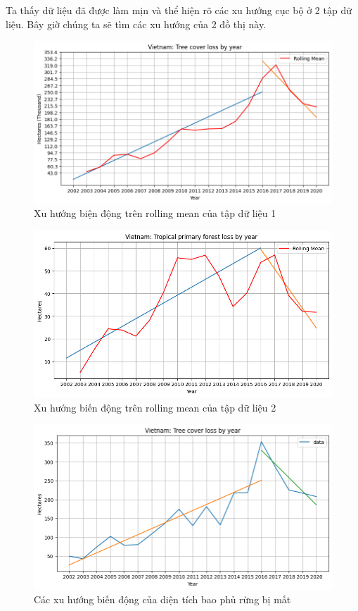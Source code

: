 \documentclass[a4paper,12pt]{report}
\begin{document}
\begin{flushleft}
	Ta thấy dữ liệu đã được làm mịn và thể hiện rõ các xu hướng cục bộ ở 2 tập dữ liệu. Bây giờ chúng ta sẽ tìm các xu hướng của 2 đồ thị này.

	\begin{figure}[H]
			\centering
			\includegraphics[width = \textwidth]{images/tree_cover_loss_by_year_trends_rolling_mean.png}
			\caption{Xu hướng biện động trên rolling mean của tập dữ liệu 1}
	\end{figure}

	\begin{figure}[H]
			\centering
			\includegraphics[width = \textwidth]{images/tropical_primary_forest_loss_by_year_trends_rolling_mean.png}
			\caption{Xu hướng biến động trên rolling mean của tập dữ liệu 2}
	\end{figure}

	\begin{figure}[H]
			\centering
			\includegraphics[width = \textwidth]{images/tree_cover_loss_by_year_trends.png}
			\caption{Các xu hướng biến động của diện tích bao phủ rừng bị mất}
	\end{figure}


\end{flushleft}
\end{document}
